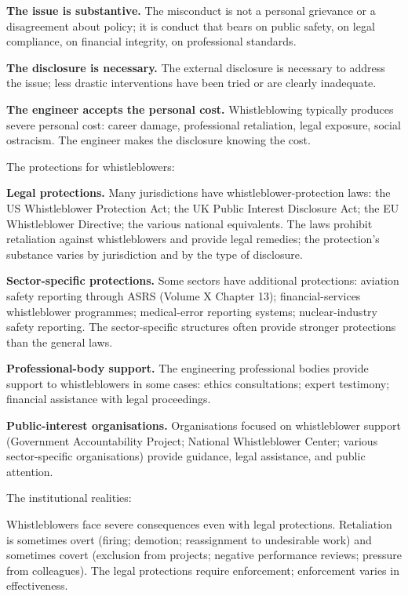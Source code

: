 \textbf{The issue is substantive.} The misconduct is not a personal grievance or a disagreement about policy; it is conduct that bears on public safety, on legal compliance, on financial integrity, on professional standards.

\textbf{The disclosure is necessary.} The external disclosure is necessary to address the issue; less drastic interventions have been tried or are clearly inadequate.

\textbf{The engineer accepts the personal cost.} Whistleblowing typically produces severe personal cost: career damage, professional retaliation, legal exposure, social ostracism. The engineer makes the disclosure knowing the cost.

The protections for whistleblowers:

\textbf{Legal protections.} Many jurisdictions have whistleblower-protection laws: the US Whistleblower Protection Act; the UK Public Interest Disclosure Act; the EU Whistleblower Directive; the various national equivalents. The laws prohibit retaliation against whistleblowers and provide legal remedies; the protection's substance varies by jurisdiction and by the type of disclosure.

\textbf{Sector-specific protections.} Some sectors have additional protections: aviation safety reporting through ASRS (Volume X Chapter 13); financial-services whistleblower programmes; medical-error reporting systems; nuclear-industry safety reporting. The sector-specific structures often provide stronger protections than the general laws.

\textbf{Professional-body support.} The engineering professional bodies provide support to whistleblowers in some cases: ethics consultations; expert testimony; financial assistance with legal proceedings.

\textbf{Public-interest organisations.} Organisations focused on whistleblower support (Government Accountability Project; National Whistleblower Center; various sector-specific organisations) provide guidance, legal assistance, and public attention.

The institutional realities:

Whistleblowers face severe consequences even with legal protections. Retaliation is sometimes overt (firing; demotion; reassignment to undesirable work) and sometimes covert (exclusion from projects; negative performance reviews; pressure from colleagues). The legal protections require enforcement; enforcement varies in effectiveness.

